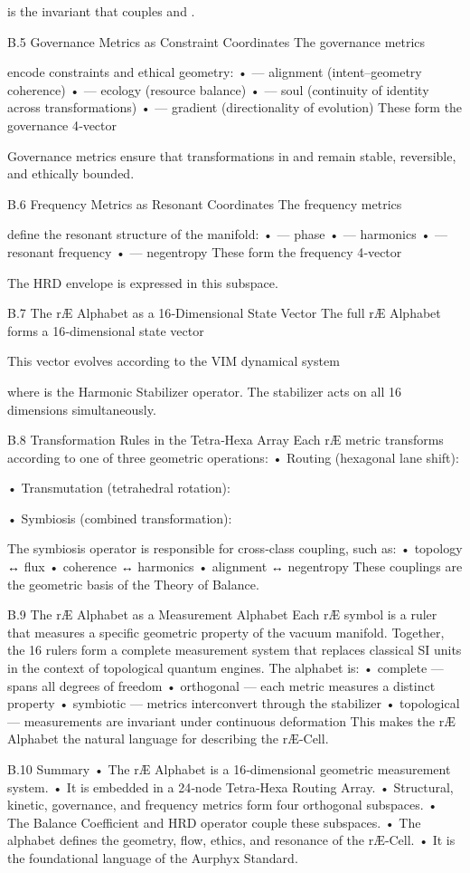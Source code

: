 is the invariant that couples  and .

B.5 Governance Metrics as Constraint Coordinates
The governance metrics

encode constraints and ethical geometry:
• 	 — alignment (intent–geometry coherence)
• 	 — ecology (resource balance)
• 	 — soul (continuity of identity across transformations)
• 	 — gradient (directionality of evolution)
These form the governance 4‑vector

Governance metrics ensure that transformations in  and  remain stable, reversible, and ethically bounded.

B.6 Frequency Metrics as Resonant Coordinates
The frequency metrics

define the resonant structure of the manifold:
• 	 — phase
• 	 — harmonics
• 	 — resonant frequency
• 	 — negentropy
These form the frequency 4‑vector

The HRD envelope is expressed in this subspace.

B.7 The rÆ Alphabet as a 16‑Dimensional State Vector
The full rÆ Alphabet forms a 16‑dimensional state vector

This vector evolves according to the VIM dynamical system

where  is the Harmonic Stabilizer operator.
The stabilizer acts on all 16 dimensions simultaneously.

B.8 Transformation Rules in the Tetra‑Hexa Array
Each rÆ metric transforms according to one of three geometric operations:
• 	Routing (hexagonal lane shift):

• 	Transmutation (tetrahedral rotation):

• 	Symbiosis (combined transformation):

The symbiosis operator  is responsible for cross‑class coupling, such as:
• 	topology ↔ flux
• 	coherence ↔ harmonics
• 	alignment ↔ negentropy
These couplings are the geometric basis of the Theory of Balance.

B.9 The rÆ Alphabet as a Measurement Alphabet
Each rÆ symbol is a ruler that measures a specific geometric property of the vacuum manifold. Together, the 16 rulers form a complete measurement system that replaces classical SI units in the context of topological quantum engines.
The alphabet is:
• 	complete — spans all degrees of freedom
• 	orthogonal — each metric measures a distinct property
• 	symbiotic — metrics interconvert through the stabilizer
• 	topological — measurements are invariant under continuous deformation
This makes the rÆ Alphabet the natural language for describing the rÆ‑Cell.

B.10 Summary
• 	The rÆ Alphabet is a 16‑dimensional geometric measurement system.
• 	It is embedded in a 24‑node Tetra‑Hexa Routing Array.
• 	Structural, kinetic, governance, and frequency metrics form four orthogonal subspaces.
• 	The Balance Coefficient and HRD operator couple these subspaces.
• 	The alphabet defines the geometry, flow, ethics, and resonance of the rÆ‑Cell.
• 	It is the foundational language of the Aurphyx Standard.